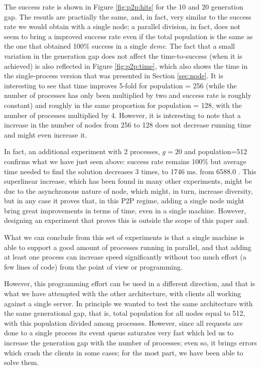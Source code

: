 \documentclass{sig-alternate}
\begin{document}
The success rate is shown in Figure \ref{fig:p2p:hits} for the 10 and
20 generation gap. The resutls are practially the same, and, in fact,
very similar to the success rate we would obtain with a single node; a
parallel division, in fact, does not seem to bring a improved success
rate even if the total population is the same as the one that obtained
100\% success in a single {\em deme}. The fact that a small variation
in the generation gap does not affect the time-to-success (when it is
achieved) is also reflected in Figure \ref{fig:p2p:time}, which also
shows the time in the single-process version that was presented in
Section \ref{sec:node}. It is interesting to see that time improves
5-fold for population = 256 (while the number of processes has only been
multiplied by two and success rate is roughly constant)  and roughly
in the same proportion for population = 128, with the number of
processes multiplied by 4. However, it is interesting to note that a
increase in the number of nodes from 256 to 128 does not decrease
running time and might even increase it. 

In fact, an additional experiment with 2 processes, $g=20$ and
population=512 confirms  what we have just seen above: success rate
remains 100\% but average time needed to find the solution decreases 3
times, to  1746 ms. from  6588.0 . This superlinear increase, which
has been found in many other experiments, might be due to the
asynchronous nature of node, which might, in turn, increase
diversity, but in any case it proves that, in this P2P regime, adding
a single node might bring great improvements in terms of time, even in
a single machine. However, designing an experiment that proves this is
outside the scope of this paper and.

What we can conclude from this set of experiments is that a single
machine is able to support a good amount of processes running in
parallel, and that adding at least one process can increase speed
significantly without too much effort (a few lines of code) from the
point of view or programming. 

However, this programming effort can be used in a different direction,
and that is what we have attempted with the other architecture, with
clients all working against a single server. In principle we wanted to
test the same architecture with the same generational gap, that is,
total population for all nodes equal to 512, with this population
divided among processes. However, since all requests are done to a
single process its event queue saturates very fast which led us to
increase the generation gap with the number of processes; even so, it
brings errors which crash the clients in some cases; for the most
part, we have been able to solve them. 
\end{document}
